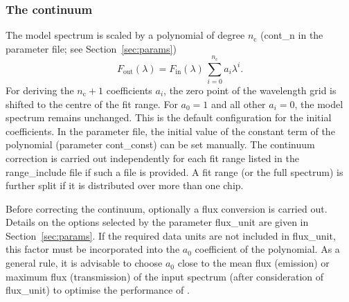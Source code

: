 \subsubsection{The continuum}\label{sec:continuum}
The model spectrum is scaled by a polynomial of degree $n_\mathrm{c}$
({\sc cont\_n} in the parameter file; see Section~\ref{sec:params})
\begin{equation}
F_\mathrm{out}(\lambda) =
F_\mathrm{in}(\lambda) \, \sum_{i = 0}^{n_\mathrm{c}} a_i \lambda^i.
\end{equation}
For deriving the $n_\mathrm{c} + 1$ coefficients $a_i$, the zero point of the
wavelength grid is shifted to the centre of the fit range. For $a_0 = 1$ and
all other $a_i = 0$, the model spectrum remains unchanged. This is the default
configuration for the initial coefficients. In the parameter file, the
initial value of the constant term of the polynomial (parameter
{\sc cont\_const}) can be set manually. The continuum correction is carried
out independently for each fit range listed in the {\sc range\_include} file
if such a file is provided. A fit range (or the full spectrum) is further
split if it is distributed over more than one chip.

Before correcting the continuum, optionally a flux conversion is carried out.
Details on the options selected by the parameter {\sc flux\_unit} are given in
Section~\ref{sec:params}. If the required data units are not included in
{\sc flux\_unit}, this factor must be incorporated into the $a_0$ coefficient
of the polynomial. As a general rule, it is advisable to choose $a_0$ close to
the mean flux (emission) or maximum flux (transmission) of the input spectrum
(after consideration of {\sc flux\_unit}) to optimise the performance of \mf.

